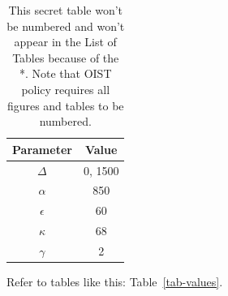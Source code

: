 \begin{table}[htbp] \center
    \caption*{This secret table won't be numbered and won't appear in the List of Tables because of the *. Note that OIST policy requires all figures and tables to be numbered.}
    \begin{tabular}{c|c}
        Parameter    & Value   \\ \hline \hline
        $\Delta$     & 0, 1500 \\
        ${\alpha}$   & 850     \\
        ${\epsilon}$ & 60      \\
        ${\kappa}$   & 68      \\
        ${\gamma}$   & 2
    \end{tabular}
\end{table}


Refer to tables like this: Table~\ref{tab-values}.
